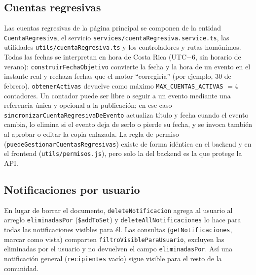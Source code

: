 \subsection{Cuentas regresivas}
Las cuentas regresivas de la página principal se componen de la entidad \texttt{CuentaRegresiva}, el servicio \texttt{services/cuentaRegresiva.service.ts}, las utilidades \texttt{utils/cuentaRegresiva.ts} y los controladores y rutas homónimos. Todas las fechas se interpretan en hora de Costa Rica (UTC$-6$, sin horario de verano): \texttt{construirFechaObjetivo} convierte la fecha y la hora de un evento en el instante real y rechaza fechas que el motor ``corregiría'' (por ejemplo, 30 de febrero). \texttt{obtenerActivas} devuelve como máximo \texttt{MAX\_CUENTAS\_ACTIVAS} $=4$ contadores. Un contador puede ser libre o seguir a un evento mediante una referencia única y opcional a la publicación; en ese caso \texttt{sincronizarCuentaRegresivaDeEvento} actualiza título y fecha cuando el evento cambia, lo elimina si el evento deja de serlo o pierde su fecha, y se invoca también al aprobar o editar la copia enlazada. La regla de permiso (\texttt{puedeGestionarCuentasRegresivas}) existe de forma idéntica en el backend y en el frontend (\texttt{utils/permisos.js}), pero solo la del backend es la que protege la API.

\subsection{Notificaciones por usuario}
En lugar de borrar el documento, \texttt{deleteNotificacion} agrega al usuario al arreglo \texttt{eliminadasPor} (\texttt{\$addToSet}) y \texttt{deleteAllNotificaciones} lo hace para todas las notificaciones visibles para él. Las consultas (\texttt{getNotificaciones}, marcar como vista) comparten \texttt{filtroVisibleParaUsuario}, excluyen las eliminadas por el usuario y no devuelven el campo \texttt{eliminadasPor}. Así una notificación general (\texttt{recipientes} vacío) sigue visible para el resto de la comunidad.

